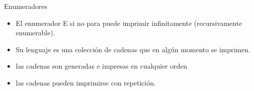 \documentclass[11pt]{beamer}
\begin{document}
		\begin{frame}{Enumeradores}
			\justifying
            
            \begin{itemize}
                \item El enumerador E si no para puede imprimir infinitamente (recursivamente enumerable).
                \item Su lenguaje es una colección de cadenas que en algún momento se imprimen.
                \item las cadenas son generadas e impresas en cualquier orden
                \item las cadenas pueden imprimirse con repetición.
            \end{itemize}
		\end{frame}
		
\end{document}
